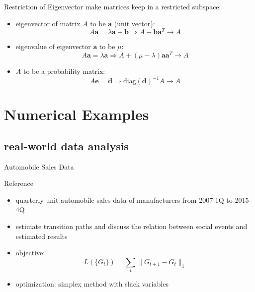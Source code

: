 \documentclass[fleqn,aspectratio=1610]{beamer}
\begin{document}
\begin{frame}[label={sec:org2abd949}]{Restriction of Eigenvector}
make matrices keep in a restricted subspace:
\begin{itemize}
\item eigenvector of matrix \(A\) to be
\(\boldsymbol{a}\) (unit vector):
\begin{equation}
  A\boldsymbol{a}=\lambda \boldsymbol{a}+\boldsymbol{b}
  \Rightarrow A-\boldsymbol{b}\boldsymbol{a}^T \rightarrow A
\end{equation}
\item eigenvalue of eigenvector \(\boldsymbol{a}\)
to be \(\mu\):
\begin{equation}
  A\boldsymbol{a}=\lambda \boldsymbol{a}
  \Rightarrow A+(\mu-\lambda)\boldsymbol{a}\boldsymbol{a}^T \rightarrow A
\end{equation}
\item \(A\) to be a probability matrix:
\begin{equation}
  A\boldsymbol{e}=\boldsymbol{d}
  \Rightarrow \mathrm{diag}(\boldsymbol{d})^{-1}A \rightarrow A
\end{equation}
\end{itemize}
\end{frame}

\section{Numerical Examples}
\label{sec:org000d845}
\subsection{real-world data analysis}
\label{sec:orgc010065}
\begin{frame}[label={sec:org4fafe6b}]{Automobile Sales Data}
\begin{block}{Reference}
\citeauthor{Chiba_etal2017}
\end{block}
\begin{itemize}
\item quarterly unit automobile sales data of manufacturers from
2007-1Q to 2015-4Q
\item estimate transition paths and discuss the relation between
social events and estimated results
\item objective:
\begin{equation}
  L(\{G_t\}) = \sum_t \|G_{t+1}-G_t\|_{1}
\end{equation}
\item optimization:
simplex method with slack variables
\end{itemize}
\end{frame}
\end{document}
